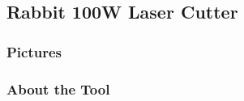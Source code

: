 \subsection*{Rabbit 100W Laser Cutter}

\subsubsection*{Pictures}



\subsubsection*{About the Tool}


